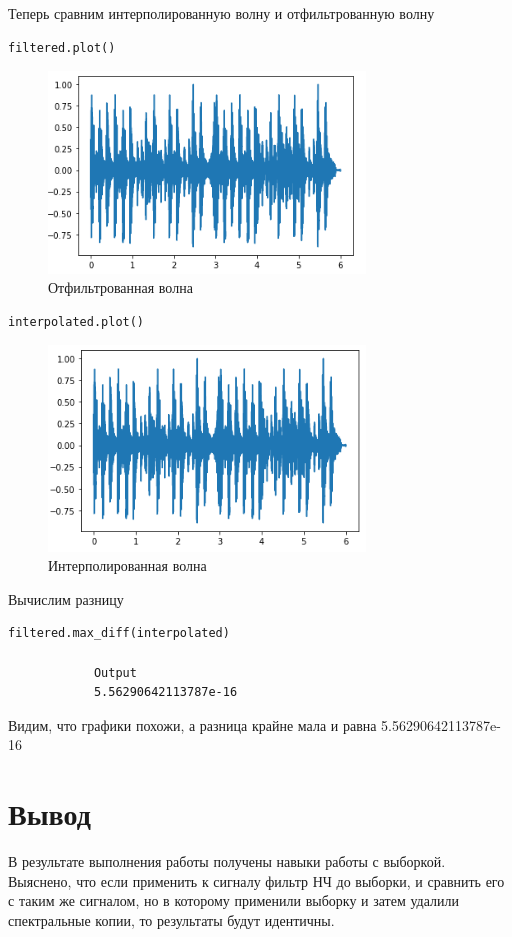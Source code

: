 \documentclass[a4paper,12pt]{article}
\begin{document}
\begin{enumerate}
		Теперь сравним интерполированную волну и отфильтрованную волну
		\begin{lstlisting}[caption=Отфильтрованная волна]
			filtered.plot()
		\end{lstlisting}
		\begin{figure}[H]
			\centering
			\includegraphics[width=0.75\textwidth]{3_7.png}
			\caption{Отфильтрованная волна}
			\label{fig:3.7}
		\end{figure}
		\begin{lstlisting}[caption=Интерполированная волна]
			interpolated.plot()
		\end{lstlisting}
		\begin{figure}[H]
			\centering
			\includegraphics[width=0.75\textwidth]{3_8.png}
			\caption{Интерполированная волна}
			\label{fig:3.8}
		\end{figure}
	
		Вычислим разницу
		\begin{lstlisting}[caption=Разница]
			filtered.max_diff(interpolated)
			
			Output
			5.56290642113787e-16
		\end{lstlisting}
		
		Видим, что графики похожи, а разница крайне мала и равна 5.56290642113787e-16
		
		
		\section{Вывод}
		
		В результате выполнения работы получены навыки работы с выборкой. Выяснено, что если применить к сигналу фильтр НЧ до выборки, и сравнить его с таким же сигналом, но в которому применили выборку и затем удалили спектральные копии, то результаты будут идентичны.
		
	\end{enumerate}
\end{document}
